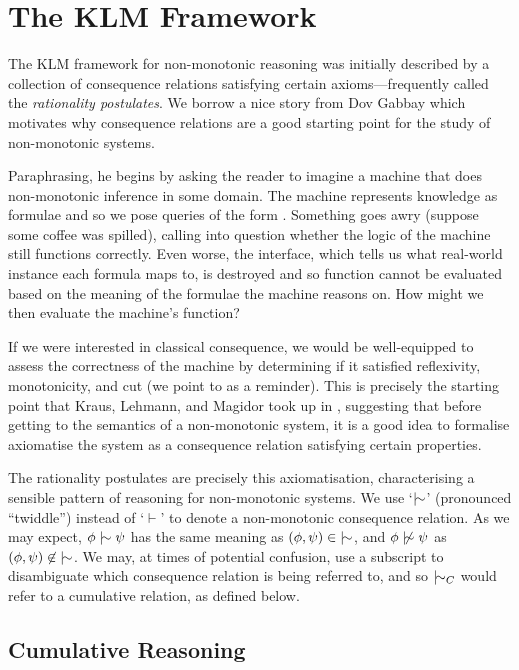 \section{The KLM Framework}
The KLM framework for non-monotonic reasoning was initially described by a collection of consequence relations satisfying
certain axioms---frequently called the \textit{rationality postulates}. We borrow a nice story from Dov Gabbay \cite{gabbay1985theoreticalFoundations}
which motivates why consequence relations are a good starting point for the study of non-monotonic systems.

Paraphrasing, he begins by asking the reader to imagine a machine that does non-monotonic inference in some domain. The machine
represents knowledge as formulae and so we pose queries of the form .
Something goes awry (suppose some coffee was spilled), calling into question whether the logic of the machine still
functions correctly. Even worse, the interface, which tells us what real-world instance each formula maps to, is
destroyed and so function cannot be evaluated based on the meaning of the formulae the machine reasons on. How might we then
evaluate the machine's function?

If we were interested in classical consequence, we would be well-equipped to assess the correctness of the machine by
determining if it satisfied reflexivity, monotonicity, and cut (we point to  as a
reminder). This is precisely the starting point that Kraus, Lehmann, and Magidor took up in \cite{kraus1990nonmonotonic},
suggesting that before getting to the semantics of a non-monotonic system, it is a good idea to formalise axiomatise the
system as a consequence relation satisfying certain properties.

The rationality postulates are precisely this axiomatisation, characterising a sensible pattern of reasoning for non-monotonic
systems. We use `$\twiddle$' (pronounced ``twiddle'') instead of `$\vdash$' to denote a non-monotonic consequence relation.
As we may expect, $\phi \twiddle \psi$ has the same meaning as $(\phi, \psi) \in \; \twiddle$, and $\phi \ntwiddle \psi$
as $(\phi, \psi)\not \in \; \twiddle$. We may, at times of potential confusion, use a subscript to disambiguate which consequence
relation is being referred to, and so $\twiddle_{C}$ would refer to a cumulative relation, as defined below.

\subsection{Cumulative Reasoning}
\label{subsection:system-c} 

